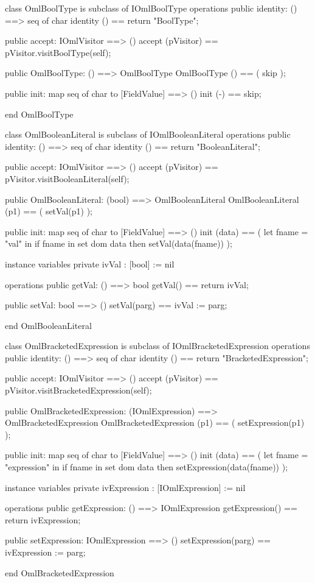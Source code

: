 \begin{vdm_al}
class OmlBoolType is subclass of IOmlBoolType
operations
  public identity: () ==> seq of char
  identity () == return "BoolType";

  public accept: IOmlVisitor ==> ()
  accept (pVisitor) == pVisitor.visitBoolType(self);

  public OmlBoolType:
      () ==> OmlBoolType
  OmlBoolType () == 
    ( skip );

  public init: map seq of char to [FieldValue] ==> ()
  init (-) == skip;

end OmlBoolType
\end{vdm_al}

\begin{vdm_al}
class OmlBooleanLiteral is subclass of IOmlBooleanLiteral
operations
  public identity: () ==> seq of char
  identity () == return "BooleanLiteral";

  public accept: IOmlVisitor ==> ()
  accept (pVisitor) == pVisitor.visitBooleanLiteral(self);

  public OmlBooleanLiteral:
      (bool) ==> OmlBooleanLiteral
  OmlBooleanLiteral (p1) == 
   ( setVal(p1) );

  public init: map seq of char to [FieldValue] ==> ()
  init (data) ==
    ( let fname = "val" in
        if fname in set dom data
        then setVal(data(fname)) );

instance variables
  private ivVal : [bool] := nil

operations
  public getVal: () ==> bool
  getVal() == return ivVal;

  public setVal: bool ==> ()
  setVal(parg) == ivVal := parg;

end OmlBooleanLiteral
\end{vdm_al}

\begin{vdm_al}
class OmlBracketedExpression is subclass of IOmlBracketedExpression
operations
  public identity: () ==> seq of char
  identity () == return "BracketedExpression";

  public accept: IOmlVisitor ==> ()
  accept (pVisitor) == pVisitor.visitBracketedExpression(self);

  public OmlBracketedExpression:
      (IOmlExpression) ==> OmlBracketedExpression
  OmlBracketedExpression (p1) == 
   ( setExpression(p1) );

  public init: map seq of char to [FieldValue] ==> ()
  init (data) ==
    ( let fname = "expression" in
        if fname in set dom data
        then setExpression(data(fname)) );

instance variables
  private ivExpression : [IOmlExpression] := nil

operations
  public getExpression: () ==> IOmlExpression
  getExpression() == return ivExpression;

  public setExpression: IOmlExpression ==> ()
  setExpression(parg) == ivExpression := parg;

end OmlBracketedExpression
\end{vdm_al}

